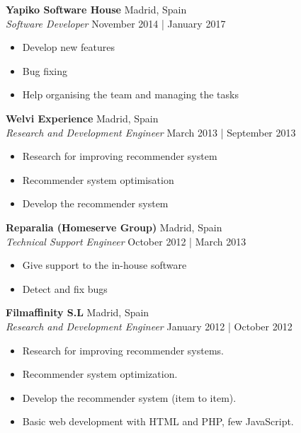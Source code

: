 \documentclass[a4paper]{article}
\begin{document}
\textbf{Yapiko Software House} \hfill Madrid, Spain\\
\textit{Software Developer} \hfill November 2014 | January 2017\\
\vspace{-1mm}
\begin{itemize} \itemsep 1pt
	\item Develop new features
	\item Bug fixing
	\item Help organising the team and managing the tasks
\end{itemize}

\textbf{Welvi Experience} \hfill Madrid, Spain\\
\textit{Research and Development Engineer} \hfill March 2013 | September 2013\\
\vspace{-1mm}
\begin{itemize} \itemsep 1pt
	\item Research for improving recommender system
	\item Recommender system optimisation
	\item Develop the recommender system
\end{itemize}

\textbf{Reparalia (Homeserve Group)} \hfill Madrid, Spain\\
\textit{Technical Support Engineer} \hfill October 2012 | March 2013\\
\vspace{-1mm}
\begin{itemize} \itemsep 1pt
	\item Give support to the in-house software
	\item Detect and fix bugs
\end{itemize}

\textbf{Filmaffinity S.L} \hfill Madrid, Spain\\
\textit{Research and Development Engineer} \hfill January 2012 | October 2012\\
\vspace{-1mm}
\begin{itemize} \itemsep 1pt
	\item Research for improving recommender systems.
	\item Recommender system optimization.
	\item Develop the recommender system (item to item).
	\item Basic web development with HTML and PHP, few JavaScript.
\end{itemize}
\end{document}
